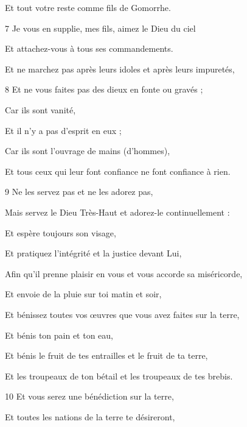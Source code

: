 \par     Et tout votre reste comme fils de Gomorrhe.
\par    
\par 7 Je vous en supplie, mes fils, aimez le Dieu du ciel  
\par     Et attachez-vous à tous ses commandements.
\par    
\par     Et ne marchez pas après leurs idoles et après leurs impuretés,  
\par    
\par 8 Et ne vous faites pas des dieux en fonte ou gravés ;
\par    
\par     Car ils sont vanité,  
\par     Et il n’y a pas d’esprit en eux ;
\par    
\par     Car ils sont l'ouvrage de mains (d'hommes),  
\par     Et tous ceux qui leur font confiance ne font confiance à rien.
\par    
\par 9 Ne les servez pas et ne les adorez pas,  
\par     Mais servez le Dieu Très-Haut et adorez-le continuellement :  
\par     Et espère toujours son visage,  
\par     Et pratiquez l'intégrité et la justice devant Lui,
\par    
\par     Afin qu'il prenne plaisir en vous et vous accorde sa miséricorde,  
\par     Et envoie de la pluie sur toi matin et soir,
\par    
\par     Et bénissez toutes vos œuvres que vous avez faites sur la terre,  
\par     Et bénis ton pain et ton eau,
\par    
\par     Et bénis le fruit de tes entrailles et le fruit de ta terre,  
\par     Et les troupeaux de ton bétail et les troupeaux de tes brebis.
\par    
\par 10 Et vous serez une bénédiction sur la terre,  
\par     Et toutes les nations de la terre te désireront,
\par    
